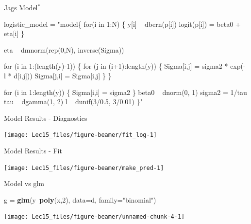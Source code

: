 \documentclass[11pt,ignorenonframetext,]{beamer}
\newenvironment{Shaded}{}{}
\newcommand{\DataTypeTok}[1]{\textcolor[rgb]{0.56,0.13,0.00}{#1}}
\newcommand{\DecValTok}[1]{\textcolor[rgb]{0.25,0.63,0.44}{#1}}
\newcommand{\KeywordTok}[1]{\textcolor[rgb]{0.00,0.44,0.13}{\textbf{#1}}}
\newcommand{\NormalTok}[1]{#1}
\newcommand{\OperatorTok}[1]{\textcolor[rgb]{0.40,0.40,0.40}{#1}}
\newcommand{\StringTok}[1]{\textcolor[rgb]{0.25,0.44,0.63}{#1}}
\let\oldShaded\Shaded
\let\endoldShaded\endShaded
\renewenvironment{Shaded}{\footnotesize\begin{spacing}{0.9}\oldShaded}{\endoldShaded\end{spacing}}
\let\oldverbatim\verbatim
\let\endoldverbatim\endverbatim
\newcommand{\scriptoutput}{
  \renewenvironment{Shaded}{\scriptsize\begin{spacing}{0.9}\oldShaded}{\endoldShaded\end{spacing}}
  \renewenvironment{verbatim}{\scriptsize\begin{spacing}{0.9}\oldverbatim}{\endoldverbatim\end{spacing}}
}
\begin{document}
\begin{frame}[fragile]{Jags Model\(^*\)}
\protect\hypertarget{jags-model}{}

\scriptoutput

\begin{Shaded}
\begin{Highlighting}[]
\NormalTok{logistic_model =}\StringTok{ "model\{}
\StringTok{  for(i in 1:N) \{}
\StringTok{    y[i] ~ dbern(p[i])}
\StringTok{    logit(p[i]) = beta0 + eta[i]}
\StringTok{  \}}

\StringTok{  eta ~ dmnorm(rep(0,N), inverse(Sigma))}

\StringTok{  for (i in 1:(length(y)-1)) \{}
\StringTok{    for (j in (i+1):length(y)) \{}
\StringTok{      Sigma[i,j] = sigma2 * exp(- l * d[i,j]))}
\StringTok{      Sigma[j,i] = Sigma[i,j]}
\StringTok{    \}}
\StringTok{  \}}

\StringTok{  for (i in 1:length(y)) \{}
\StringTok{    Sigma[i,i] = sigma2}
\StringTok{  \}  }
\StringTok{  }
\StringTok{  beta0 ~ dnorm(0, 1)}
\StringTok{  sigma2 = 1/tau}
\StringTok{  tau ~ dgamma(1, 2)}
\StringTok{  l ~ dunif(3/0.5, 3/0.01)}
\StringTok{\}"}
\end{Highlighting}
\end{Shaded}

\end{frame}

\begin{frame}{Model Results - Diagnostics}
\protect\hypertarget{model-results---diagnostics}{}

\begin{center}\texttt{[image: Lec15\_files/figure-beamer/fit\_log-1]} \end{center}

\end{frame}

\begin{frame}{Model Results - Fit}
\protect\hypertarget{model-results---fit}{}

\begin{center}\texttt{[image: Lec15\_files/figure-beamer/make\_pred-1]} \end{center}

\end{frame}

\begin{frame}[fragile]{Model vs glm}
\protect\hypertarget{model-vs-glm}{}

\begin{Shaded}
\begin{Highlighting}[]
\NormalTok{g =}\StringTok{ }\KeywordTok{glm}\NormalTok{(y}\OperatorTok{~}\KeywordTok{poly}\NormalTok{(x,}\DecValTok{2}\NormalTok{), }\DataTypeTok{data=}\NormalTok{d, }\DataTypeTok{family=}\StringTok{"binomial"}\NormalTok{)}
\end{Highlighting}
\end{Shaded}

\begin{center}\texttt{[image: Lec15\_files/figure-beamer/unnamed-chunk-4-1]} \end{center}

\end{frame}
\end{document}
